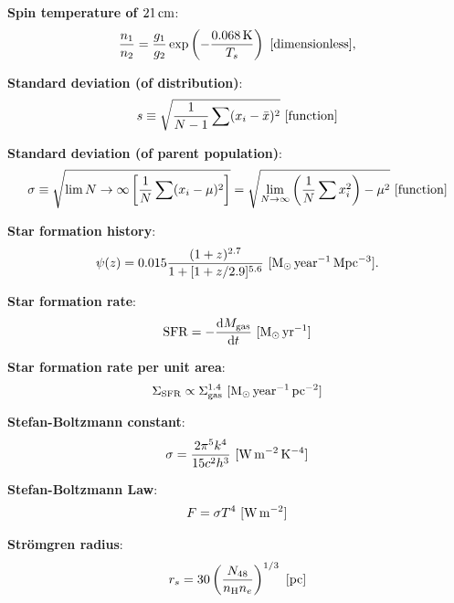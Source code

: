 \documentclass[a4paper,10pt]{article}
\begin{document}
{\noindent}\textbf{Spin temperature of $21\,{\rm cm}$}:
\begin{align*}
    \frac{n_1}{n_2} = \frac{g_1}{g_2}\exp\left(-\frac{0.068\,{\rm K}}{T_s}\right) ~ [{\rm dimensionless}],
\end{align*}

{\noindent}\textbf{Standard deviation (of distribution)}:
\begin{align*}
    s \equiv \sqrt{\frac{1}{N-1} \sum (x_i-\bar{x})^2} ~ [{\rm function}]
\end{align*}

{\noindent}\textbf{Standard deviation (of parent population)}:
\begin{align*}
    \sigma \equiv \sqrt{\lim{N\rightarrow\infty} \left[\frac{1}{N}\sum(x_i-\mu)^2\right]} = \sqrt{\lim_{N\rightarrow\infty} \left(\frac{1}{N}\sum x_i^2\right)-\mu^2} ~ [{\rm function}]
\end{align*}

{\noindent}\textbf{Star formation history}:
\begin{align*}
    \psi(z) = 0.015\frac{(1+z)^{2.7}}{1+[1+z/2.9]^{5.6}} ~ [{\rm M_\odot\,year^{-1}\,Mpc^{-3}}].
\end{align*}

{\noindent}\textbf{Star formation rate}:
\begin{align*}
    \mathrm{SFR} = -\frac{\mathrm{d}M_\mathrm{gas}}{\mathrm{d}t} ~ [{\rm M_\odot\,yr^{-1}}]
\end{align*}

{\noindent}\textbf{Star formation rate per unit area}:
\begin{align*}
    \Sigma_\mathrm{SFR} \propto \Sigma_\mathrm{gas}^{1.4} ~ [{\rm M_\odot\,year^{-1}\,pc^{-2}}]
\end{align*}

{\noindent}\textbf{Stefan-Boltzmann constant}:
\begin{align*}
    \sigma = \frac{2\pi^5k^4}{15c^2h^3} ~ [{\rm W\,m^{-2}\,K^{-4}}]
\end{align*}

{\noindent}\textbf{Stefan-Boltzmann Law}:
\begin{align*}
    F = \sigma T^4 ~ [{\rm W\,m^{-2}}]
\end{align*}

{\noindent}\textbf{Str\"omgren radius}:
\begin{align*}
    r_s = 30 \left(\frac{N_{48}}{n_{\rm H}n_e}\right)^{1/3} ~ [{\rm pc}]
\end{align*}
\end{document}
